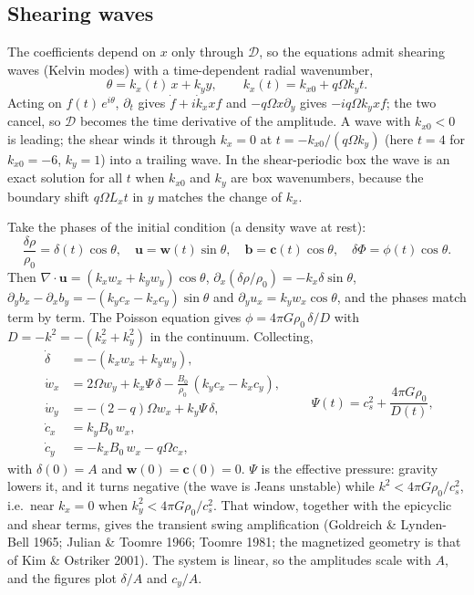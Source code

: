 \documentclass[11pt]{article}
\newcommand{\Om}{\Omega}
\begin{document}
\subsection{Shearing waves}
The coefficients depend on $x$ only through $\mathcal D$, so the equations admit shearing
waves (Kelvin modes) with a time-dependent radial wavenumber,
\begin{equation}
  \theta = k_x(t)\,x + k_y y, \qquad k_x(t) = k_{x0} + q\Om k_y t .
\end{equation}
Acting on $f(t)\,e^{i\theta}$, $\partial_t$ gives $\dot f + i\dot k_x x f$ and
$-q\Om x\partial_y$ gives $-iq\Om k_y x f$; the two cancel, so $\mathcal D$ becomes the
time derivative of the amplitude. A wave with $k_{x0} < 0$ is leading; the shear winds it
through $k_x = 0$ at $t = -k_{x0}/(q\Om k_y)$ (here $t = 4$ for $k_{x0} = -6$, $k_y = 1$)
into a trailing wave. In the shear-periodic box the wave is an exact solution for all $t$
when $k_{x0}$ and $k_y$ are box wavenumbers, because the boundary shift $q\Om L_x t$ in $y$
matches the change of $k_x$.

Take the phases of the initial condition (a density wave at rest):
\begin{equation}
  \frac{\delta\rho}{\rho_0} = \delta(t)\cos\theta, \quad
  \mathbf u = \mathbf w(t)\sin\theta, \quad
  \mathbf b = \mathbf c(t)\cos\theta, \quad
  \delta\Phi = \phi(t)\cos\theta .
\end{equation}
Then $\nabla\cdot\mathbf u = (k_x w_x + k_y w_y)\cos\theta$,
$\partial_x(\delta\rho/\rho_0) = -k_x\delta\sin\theta$,
$\partial_y b_x - \partial_x b_y = -(k_y c_x - k_x c_y)\sin\theta$ and
$\partial_y u_x = k_y w_x\cos\theta$, and the phases match term by term. The Poisson
equation gives $\phi = 4\pi G\rho_0\,\delta/D$ with $D = -k^2 = -(k_x^2 + k_y^2)$ in the
continuum. Collecting,
\begin{equation}
\boxed{
\begin{aligned}
  \dot\delta &= -(k_x w_x + k_y w_y), \\
  \dot w_x &= 2\Om w_y + k_x\Psi\,\delta - \frac{B_0}{\rho_0}\,(k_y c_x - k_x c_y), \\
  \dot w_y &= -(2-q)\Om w_x + k_y\Psi\,\delta, \\
  \dot c_x &= k_y B_0\, w_x, \\
  \dot c_y &= -k_x B_0\, w_x - q\Om c_x,
\end{aligned}
\qquad
\Psi(t) = c_s^2 + \frac{4\pi G\rho_0}{D(t)} ,}
\end{equation}
with $\delta(0) = A$ and $\mathbf w(0) = \mathbf c(0) = 0$. $\Psi$ is the effective
pressure: gravity lowers it, and it turns negative (the wave is Jeans unstable) while
$k^2 < 4\pi G\rho_0/c_s^2$, i.e.\ near $k_x = 0$ when $k_y^2 < 4\pi G\rho_0/c_s^2$. That
window, together with the epicyclic and shear terms, gives the transient swing
amplification (Goldreich \& Lynden-Bell 1965; Julian \& Toomre 1966; Toomre 1981; the
magnetized geometry is that of Kim \& Ostriker 2001). The system is linear, so the
amplitudes scale with $A$, and the figures plot $\delta/A$ and $c_y/A$.
\end{document}
